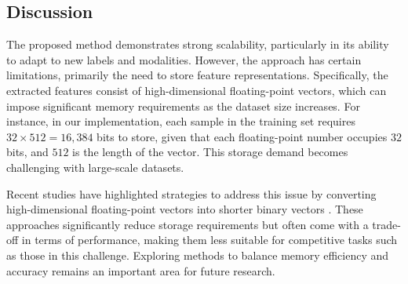 \subsection{Discussion}
The proposed method demonstrates strong scalability, particularly in its ability to adapt to new labels and modalities. However, the approach has certain limitations, primarily the need to store feature representations. Specifically, the extracted features consist of high-dimensional floating-point vectors, which can impose significant memory requirements as the dataset size increases. For instance, in our implementation, each sample in the training set requires $32 \times 512 = 16,384$ bits to store, given that each floating-point number occupies $32$ bits, and $512$ is the length of the vector. This storage demand becomes challenging with large-scale datasets.

Recent studies have highlighted strategies to address this issue by converting high-dimensional floating-point vectors into shorter binary vectors \cite{cui2020exchnet, shen2022semicon}. These approaches significantly reduce storage requirements but often come with a trade-off in terms of performance, making them less suitable for competitive tasks such as those in this challenge. Exploring methods to balance memory efficiency and accuracy remains an important area for future research.
